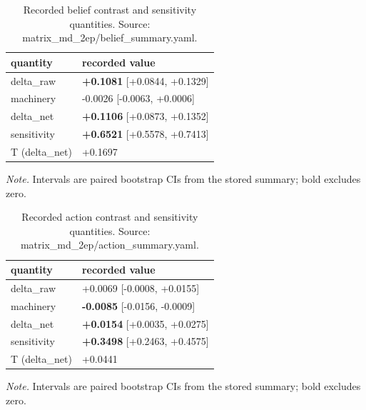 \documentclass[10pt]{article}
\begin{document}
\begin{table}[!t]
\centering
\footnotesize
\caption{ Recorded belief contrast and sensitivity quantities. Source: matrix\_md\_2ep/belief\_summary.yaml. }

\begin{tabular}{ ll }
\toprule
quantity & recorded value \\
\midrule

delta\_raw & \textbf{+0.1081} [+0.0844, +0.1329] \\

machinery & -0.0026 [-0.0063, +0.0006] \\

delta\_net & \textbf{+0.1106} [+0.0873, +0.1352] \\

sensitivity & \textbf{+0.6521} [+0.5578, +0.7413] \\

T (delta\_net) & +0.1697 \\

\bottomrule
\end{tabular}

\par\footnotesize\emph{Note.} Intervals are paired bootstrap CIs from the stored summary; bold excludes zero.
\end{table}


\begin{table}[!t]
\centering
\footnotesize
\caption{ Recorded action contrast and sensitivity quantities. Source: matrix\_md\_2ep/action\_summary.yaml. }

\begin{tabular}{ ll }
\toprule
quantity & recorded value \\
\midrule

delta\_raw & +0.0069 [-0.0008, +0.0155] \\

machinery & \textbf{-0.0085} [-0.0156, -0.0009] \\

delta\_net & \textbf{+0.0154} [+0.0035, +0.0275] \\

sensitivity & \textbf{+0.3498} [+0.2463, +0.4575] \\

T (delta\_net) & +0.0441 \\

\bottomrule
\end{tabular}

\par\footnotesize\emph{Note.} Intervals are paired bootstrap CIs from the stored summary; bold excludes zero.
\end{table}
\end{document}

